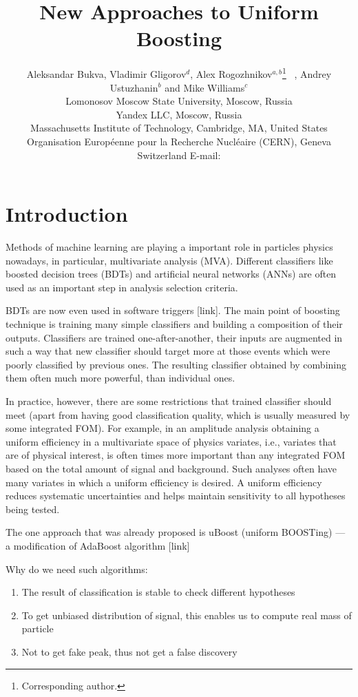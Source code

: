 \documentclass{JINST}
\title{New Approaches to Uniform Boosting}
\author{
Aleksandar Bukva, 
Vladimir Gligorov$^d$,
Alex Rogozhnikov$^{a,b}$\thanks{Corresponding author.}~ ,
Andrey Ustuzhanin$^b$ and
Mike Williams$^c$\\
\llap{$^a$}Lomonosov Moscow State University, Moscow, Russia\\
\llap{$^b$}Yandex LLC, Moscow, Russia\\
\llap{$^c$}Massachusetts Institute of Technology, Cambridge, MA, United States \\
\llap{$^d$}Organisation Européenne pour la Recherche Nucléaire (CERN), Geneva \\Switzerland 
E-mail: \email{alex.rogozhnikov@yandex.ru}}
\theoremstyle{definition}
\theoremstyle{remark}
\begin{document}
\maketitle


\section{Introduction}

Methods of machine learning are playing a important role in particles physics nowadays, in particular, multivariate analysis (MVA). 
Different classifiers like boosted decision trees (BDTs) and artificial neural networks (ANNs) are often used as an important step in analysis selection criteria. 

BDTs are now even used in software triggers [link]. The main point of boosting technique is training many simple classifiers and building a composition of their outputs.
Classifiers are trained one-after-another, their inputs are augmented in such a way that new classifier should target more at those events which were poorly classified by previous ones. The resulting classifier obtained by combining them often much more powerful, than individual ones.


In practice, however, there are some restrictions that trained classifier should meet (apart from having good classification quality, which is usually measured by some integrated FOM). For example, in an amplitude analysis obtaining a uniform efficiency in a multivariate space of physics variates, i.e., variates that are of physical interest, is often times more important than any integrated FOM based on the total amount of signal and background. Such analyses often have many variates in which a uniform efficiency is desired. A uniform efficiency reduces systematic uncertainties and helps maintain sensitivity to all hypotheses being tested.

The one approach that was already proposed is uBoost (uniform BOOSTing) --- a modification of AdaBoost algorithm [link]

Why do we need such algorithms:

\begin{enumerate}
	\item The result of classification is stable to check different hypotheses
	\item To get unbiased distribution of signal, this enables us to compute real mass of particle
	\item Not to get fake peak, thus not get a false discovery
\end{enumerate}
\end{document}
